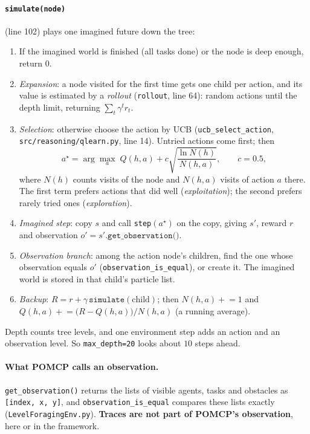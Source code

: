 \documentclass[11pt,a4paper]{article}
\newcommand{\file}{\nolinkurl}  %
\newcommand{\code}[1]{\texttt{#1}}
\theoremstyle{remark}
\begin{document}
\paragraph{\code{simulate(node)}} (line 102) plays one imagined future down the tree:
\begin{enumerate}[leftmargin=*,nosep]
  \item If the imagined world is finished (all tasks done) or the node is deep enough, return $0$.
  \item \emph{Expansion}: a node visited for the first time gets one child per action, and its value is estimated by a
        \emph{rollout} (\code{rollout}, line 64): random actions until the depth limit, returning
        $\sum_t \gamma^t r_t$.
  \item \emph{Selection}: otherwise choose the action by UCB (\code{ucb\_select\_action}, \file{src/reasoning/qlearn.py},
        line 14). Untried actions come first; then
        \begin{equation}
          a^\star = \arg\max_a \; Q(h,a) + c\sqrt{\frac{\ln N(h)}{N(h,a)}}, \qquad c = 0.5,
          \label{eq:ucb}
        \end{equation}
        where $N(h)$ counts visits of the node and $N(h,a)$ visits of action $a$ there. The first term prefers actions
        that did well (\emph{exploitation}); the second prefers rarely tried ones (\emph{exploration}).
  \item \emph{Imagined step}: copy $s$ and call \code{step}$(a^\star)$ on the copy, giving $s'$, reward $r$ and observation
        $o' = s'.\code{get\_observation()}$.
  \item \emph{Observation branch}: among the action node's children, find the one whose observation equals $o'$
        (\code{observation\_is\_equal}), or create it. The imagined world is stored in that child's particle list.
  \item \emph{Backup}: $R = r + \gamma\,\code{simulate}(\text{child})$; then $N(h,a) \mathrel{+}= 1$ and
        $Q(h,a) \mathrel{+}= \bigl(R - Q(h,a)\bigr)/N(h,a)$ (a running average).
\end{enumerate}
Depth counts tree levels, and one environment step adds an action and an observation level. So \code{max\_depth=20} looks
about $10$ steps ahead.

\paragraph{What POMCP calls an observation.} \code{get\_observation()} returns the lists of visible agents, tasks and
obstacles as \code{[index, x, y]}, and \code{observation\_is\_equal} compares these lists exactly
(\file{LevelForagingEnv.py}). \textbf{Traces are not part of POMCP's observation}, here or in the framework.
\end{document}
